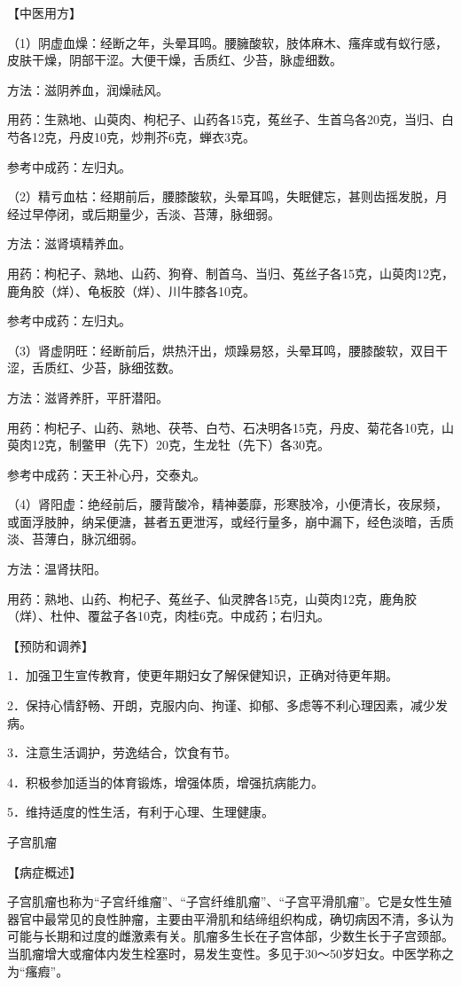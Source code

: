 \documentclass[12pt,UTF8,openany]{ctexbook}
\begin{document}
【中医用方】

（1）阴虚血燥：经断之年，头晕耳鸣。腰臃酸软，肢体麻木、瘙痒或有蚁行感，皮肤干燥，阴部干涩。大便干燥，舌质红、少苔，脉虚细数。

方法：滋阴养血，润燥祛风。

用药：生熟地、山萸肉、枸杞子、山药各15克，菟丝子、生首乌各20克，当归、白芍各12克，丹皮10克，炒荆芥6克，蝉衣3克。

参考中成药：左归丸。

（2）精亏血枯：经期前后，腰膝酸软，头晕耳鸣，失眠健忘，甚则齿摇发脱，月经过早停闭，或后期量少，舌淡、苔薄，脉细弱。

方法：滋肾填精养血。

用药：枸杞子、熟地、山药、狗脊、制首乌、当归、菟丝子各15克，山萸肉12克，鹿角胶（烊）、龟板胶（烊）、川牛膝各10克。

参考中成药：左归丸。

（3）肾虚阴旺：经断前后，烘热汗出，烦躁易怒，头晕耳鸣，腰膝酸软，双目干涩，舌质红、少苔，脉细弦数。

方法：滋肾养肝，平肝潜阳。

用药：枸杞子、山药、熟地、茯苓、白芍、石决明各15克，丹皮、菊花各10克，山萸肉12克，制鳖甲（先下）20克，生龙牡（先下）各30克。

参考中成药：天王补心丹，交泰丸。

（4）肾阳虚：绝经前后，腰背酸冷，精神萎靡，形寒肢冷，小便清长，夜尿频，或面浮肢肿，纳呆便溏，甚者五更泄泻，或经行量多，崩中漏下，经色淡暗，舌质淡、苔薄白，脉沉细弱。

方法：温肾扶阳。

用药：熟地、山药、枸杞子、菟丝子、仙灵脾各15克，山萸肉12克，鹿角胶（烊）、杜仲、覆盆子各10克，肉桂6克。中成药；右归丸。

【预防和调养】

1．加强卫生宣传教育，使更年期妇女了解保健知识，正确对待更年期。

2．保持心情舒畅、开朗，克服内向、拘谨、抑郁、多虑等不利心理因素，减少发病。

3．注意生活调护，劳逸结合，饮食有节。

4．积极参加适当的体育锻炼，增强体质，增强抗病能力。

5．维持适度的性生活，有利于心理、生理健康。





子宫肌瘤


【病症概述】

子宫肌瘤也称为“子宫纤维瘤”、“子宫纤维肌瘤”、“子宫平滑肌瘤”。它是女性生殖器官中最常见的良性肿瘤，主要由平滑肌和结缔组织构成，确切病因不清，多认为可能与长期和过度的雌激素有关。肌瘤多生长在子宫体部，少数生长于子宫颈部。当肌瘤增大或瘤体内发生栓塞时，易发生变性。多见于30～50岁妇女。中医学称之为“瘙瘕”。
\end{document}
